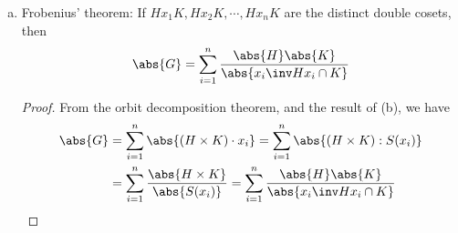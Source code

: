 \documentclass{article}
\begin{document}
\begin{itemize}
\begin{enumerate}[(a)]
			\item Frobenius' theorem: If $Hx_1K, Hx_2K, \cdots, Hx_nK$ are the distinct double cosets, then
				\[\abs{G}=\sum_{i=1}^{n} \frac{\abs{H}\abs{K}}{\abs{x_i\inv Hx_i\cap K}}\]
				\begin{proof}
					From the orbit decomposition theorem, and the result of (b), we have
					\begin{align*}
						\abs{G} &= \sum_{i=1}^{n} \abs{(H\times K)\cdot x_i} = \sum_{i=1}^{n} \abs{(H\times K):S(x_i)} \\
						&= \sum_{i=1}^{n} \frac{\abs{H\times K}}{\abs{S(x_i)}} = \sum_{i=1}^{n} \frac{\abs{H}\abs{K}}{\abs{x_i\inv Hx_i\cap K}}
					\end{align*}	
				\end{proof}
				
		\end{enumerate}
		
\end{itemize}
\end{document}
